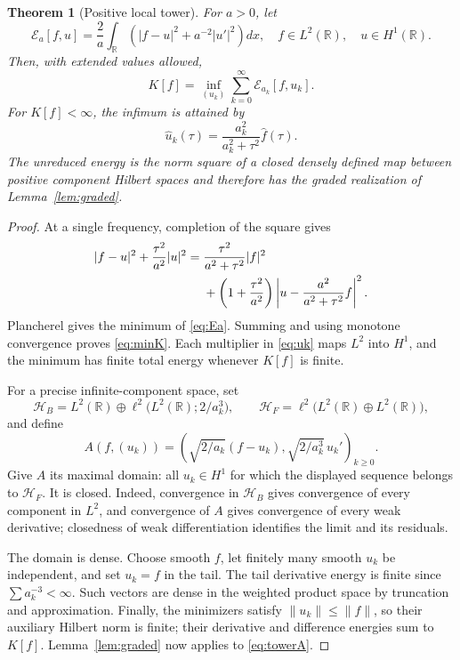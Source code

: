 \documentclass[11pt]{article}
\numberwithin{equation}{section}
\newtheorem{theorem}{Theorem}[section]
\theoremstyle{definition}
\theoremstyle{remark}
\newcommand{\R}{\mathbb R}
\newcommand{\HH}{\mathcal H}
\newcommand{\norm}[1]{\lVert#1\rVert}
\newcommand{\EE}{\mathcal E}
\begin{document}
\begin{theorem}[Positive local tower]\label{thm:tower}
For $a>0$, let
\begin{equation}
\EE_a[f,u]=\frac2a\int_\R
\left(|f-u|^2+a^{-2}|u'|^2\right)dx,
\quad f\in L^2(\R),\quad u\in H^1(\R).
\label{eq:Ea}
\end{equation}
Then, with extended values allowed,
\begin{equation}
K[f]=\inf_{(u_k)}\sum_{k=0}^\infty\EE_{a_k}[f,u_k].
\label{eq:minK}
\end{equation}
For $K[f]<\infty$, the infimum is attained by
\begin{equation}
\widehat u_k(\tau)=\frac{a_k^2}{a_k^2+\tau^2}\widehat f(\tau).
\label{eq:uk}
\end{equation}
The unreduced energy is the norm square of a closed densely defined map
between positive component Hilbert spaces and therefore has the graded
realization of Lemma~\ref{lem:graded}.
\end{theorem}
\begin{proof}
At a single frequency, completion of the square gives
\begin{align}
|f-u|^2+\frac{\tau^2}{a^2}|u|^2
={}&\frac{\tau^2}{a^2+\tau^2}|f|^2\notag\\
&+\left(1+\frac{\tau^2}{a^2}\right)
\left|u-\frac{a^2}{a^2+\tau^2}f\right|^2.
\end{align}
Plancherel gives the minimum of \eqref{eq:Ea}. Summing and using monotone
convergence proves \eqref{eq:minK}. Each multiplier in \eqref{eq:uk}
maps $L^2$ into $H^1$, and the minimum has finite total energy whenever
$K[f]$ is finite.

For a precise infinite-component space, set
\begin{equation}
\HH_B=L^2(\R)\oplus\ell^2\bigl(L^2(\R);2/a_k^3\bigr),
\qquad
\HH_F=\ell^2\bigl(L^2(\R)\oplus L^2(\R)\bigr),
\end{equation}
and define
\begin{equation}
A(f,(u_k))=
\left(\sqrt{2/a_k}(f-u_k),\sqrt{2/a_k^3}\,u_k'\right)_{k\geq0}.
\label{eq:towerA}
\end{equation}
Give $A$ its maximal domain: all $u_k\in H^1$ for which the displayed
sequence belongs to $\HH_F$. It is closed. Indeed, convergence in
$\HH_B$ gives convergence of every component in $L^2$, and convergence
of $A$ gives convergence of every weak derivative; closedness of weak
differentiation identifies the limit and its residuals.

The domain is dense. Choose smooth $f$, let finitely many smooth $u_k$
be independent, and set $u_k=f$ in the tail. The tail derivative energy
is finite since $\sum a_k^{-3}<\infty$. Such vectors are dense in the
weighted product space by truncation and approximation. Finally, the
minimizers satisfy $\norm{u_k}\leq\norm f$, so their auxiliary Hilbert
norm is finite; their derivative and difference energies sum to $K[f]$.
Lemma~\ref{lem:graded} now applies to \eqref{eq:towerA}.
\end{proof}
\end{document}
